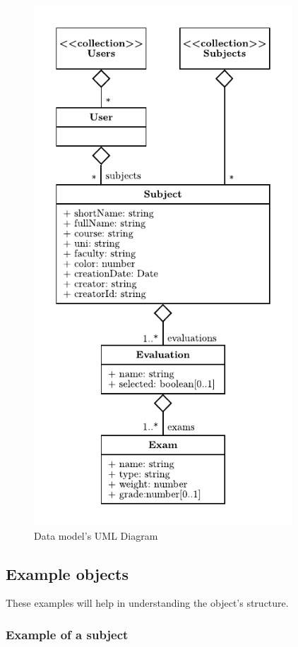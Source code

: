 \vfill
\begin{figure}[ht!]
    \center
    \includegraphics[height=19.5cm]{media/diagrams/database-uml.pdf}
    \caption{Data model's UML Diagram}
    \label{updated-gantt}
\end{figure}
\vfill

\clearpage\newpage
\subsection{Example objects}

These examples will help in understanding the object's structure.

\subsubsection{Example of a subject}

